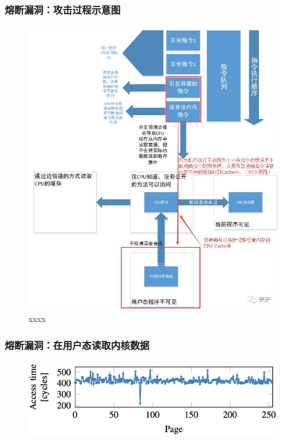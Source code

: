 \begin{frame}
    \frametitle{熔断漏洞：攻击过程示意图}
  	\begin{figure}
  	\includegraphics[width=0.4\linewidth]{figs/meltdown-method.jpg}
  	\caption{xxxx}
  	\end{figure}

\end{frame}
% 
% 
\begin{frame}
    \frametitle{熔断漏洞：在用户态读取内核数据}
  	\begin{figure}
  	\includegraphics[width=1.0\linewidth]{figs/access-duration.png}
  	\end{figure}

\end{frame}
% 
% 
% 

